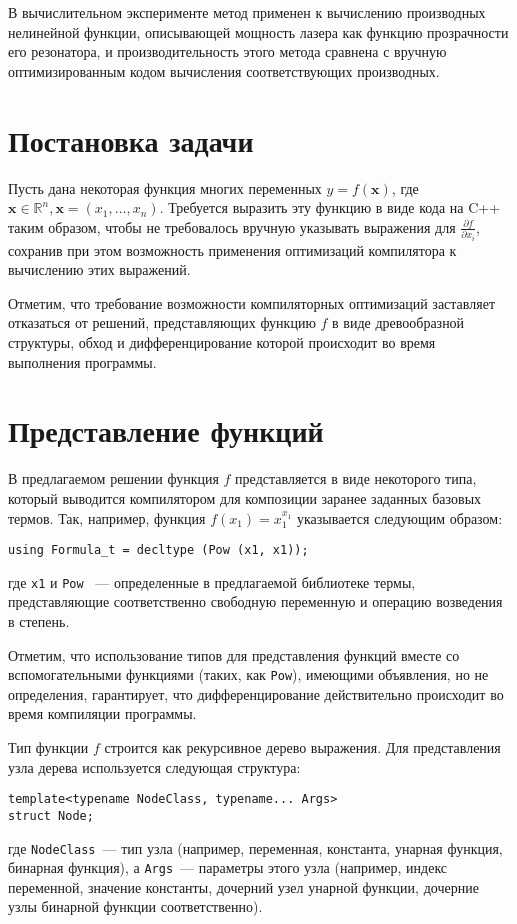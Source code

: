 \documentclass[11pt,a4paper]{article}
\begin{document}
В вычислительном эксперименте метод применен к вычислению производных нелинейной функции,
описывающей мощность лазера как функцию прозрачности его резонатора, и производительность
этого метода сравнена с вручную оптимизированным кодом вычисления соответствующих
производных.

\section{Постановка задачи}

Пусть дана некоторая функция многих переменных $y = f(\mathbf{x})$, где
$\mathbf{x} \in \mathbb{R}^n, \mathbf{x} = (x_1, \dots, x_n)$. Требуется
выразить эту функцию в виде кода на C++ таким образом, чтобы не требовалось вручную
указывать выражения для $\frac{\partial f}{\partial x_i}$, сохранив при этом возможность
применения оптимизаций компилятора к вычислению этих выражений.

Отметим, что требование возможности компиляторных оптимизаций заставляет отказаться
от решений, представляющих функцию $f$ в виде древообразной структуры, обход и
дифференцирование которой происходит во время выполнения программы.

\section{Представление функций}

В предлагаемом решении функция $f$ представляется в виде некоторого типа, который
выводится компилятором для композиции заранее заданных базовых термов. Так, например,
функция $f(x_1) = x_1^{x_1}$ указывается следующим образом:
\begin{lstlisting}
using Formula_t = decltype (Pow (x1, x1));
\end{lstlisting}
где \texttt{x1} и \texttt{Pow} ~--- определенные в предлагаемой библиотеке термы,
представляющие соответственно свободную переменную и операцию возведения в степень.

Отметим, что использование типов для представления функций вместе со вспомогательными
функциями (таких, как \texttt{Pow}), имеющими объявления, но не определения,
гарантирует, что дифференцирование действительно происходит во время компиляции программы.

Тип функции $f$ строится как рекурсивное дерево выражения. Для представления узла
дерева используется следующая структура:
\begin{lstlisting}
template<typename NodeClass, typename... Args>
struct Node;
\end{lstlisting}
где \texttt{NodeClass}~--- тип узла (например, переменная, константа, унарная функция,
бинарная функция), а \texttt{Args}~--- параметры этого узла (например, индекс переменной,
значение константы, дочерний узел унарной функции, дочерние узлы бинарной функции
соответственно).
\end{document}
